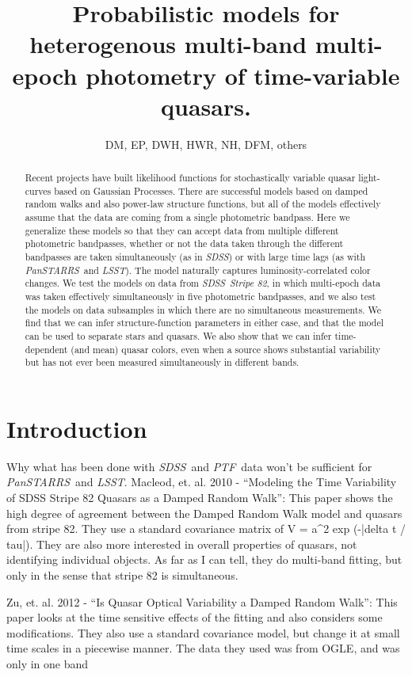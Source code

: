 \documentclass[letterpaper,12pt,preprint]{aastex}
\newcommand{\project}[1]{\textsl{#1}}
\newcommand{\sdss}{\project{SDSS}}
\newcommand{\lsst}{\project{LSST}}
\newcommand{\ptf}{\project{PTF}}
\newcommand{\panstarrs}{\project{PanSTARRS}}
\begin{document}
\title{Probabilistic models for heterogenous multi-band multi-epoch
  photometry of time-variable quasars.}
\author{DM, EP, DWH, HWR, NH, DFM, others}

\begin{abstract}
Recent projects have built likelihood functions for stochastically
variable quasar light-curves based on Gaussian Processes.  There are
successful models based on damped random walks and also power-law
structure functions, but all of the models effectively assume that the
data are coming from a single photometric bandpass.  Here we generalize
these models so that they can accept data from multiple different
photometric bandpasses, whether or not the data taken through the
different bandpasses are taken simultaneously (as in \sdss) or with
large time lags (as with \panstarrs\ and \lsst).  The model naturally
captures luminosity-correlated color changes.  We test the models on
data from \sdss\ \project{Stripe 82}, in which multi-epoch data was
taken effectively simultaneously in five photometric bandpasses, and
we also test the models on data subsamples in which there are no
simultaneous measurements.  We find that we can infer
structure-function parameters in either case, and that the model can
be used to separate stars and quasars.  We also show that we can infer
time-dependent (and mean) quasar colors, even when a source shows
substantial variability but has not ever been measured simultaneously
in different bands.
\end{abstract}


\section{Introduction}

Why what has been done with \sdss\ and \ptf\ data won't be sufficient
for \panstarrs\ and \lsst.
Macleod, et. al. 2010 - ``Modeling the Time Variability of SDSS Stripe 82 Quasars as a Damped Random Walk'':
This paper shows the high degree of agreement between the Damped Random Walk model and quasars from stripe 82. They use a standard covariance matrix of V = a^2 exp (-|delta t / tau|). They are also more interested in overall properties of quasars, not identifying individual objects. As far as I can tell, they do multi-band fitting, but only in the sense that stripe 82 is simultaneous. 

Zu, et. al. 2012 - ``Is Quasar Optical Variability a Damped Random Walk'':
This paper looks at the time sensitive effects of the fitting and also considers some modifications. They also use a standard covariance model, but change it at small time scales in a piecewise manner. The data they used was from OGLE, and was only in one band
\end{document}
